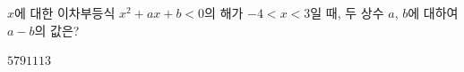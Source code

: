 \hspace*{2mm}\begin{minipage}[t]{\dimexpr\linewidth-2mm\relax}\vspace{0pt}
$x$에 대한 이차부등식 $x^2+ax+b<0$의 해가 $-4<x<3$일 때, 두 상수 $a$, $b$에 대하여 $a-b$의 값은?
\begin{choices32}{$5$}{$7$}{$9$}{$11$}{$13$}\end{choices32}\end{minipage}
